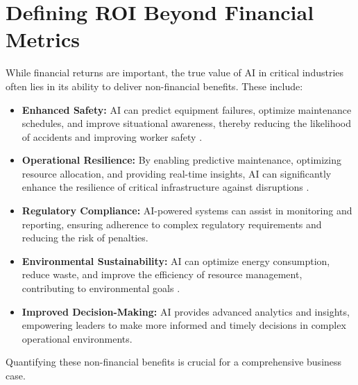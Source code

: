 \section{Defining ROI Beyond Financial Metrics}
While financial returns are important, the true value of AI in critical industries often lies in its ability to deliver non-financial benefits. These include:
\begin{itemize}
    \item \textbf{Enhanced Safety:} AI can predict equipment failures, optimize maintenance schedules, and improve situational awareness, thereby reducing the likelihood of accidents and improving worker safety \parencite{Chen2019}.
    \item \textbf{Operational Resilience:} By enabling predictive maintenance, optimizing resource allocation, and providing real-time insights, AI can significantly enhance the resilience of critical infrastructure against disruptions \parencite{Davis2020}.
    \item \textbf{Regulatory Compliance:} AI-powered systems can assist in monitoring and reporting, ensuring adherence to complex regulatory requirements and reducing the risk of penalties.
    \item \textbf{Environmental Sustainability:} AI can optimize energy consumption, reduce waste, and improve the efficiency of resource management, contributing to environmental goals \parencite{Wang2021}.
    \item \textbf{Improved Decision-Making:} AI provides advanced analytics and insights, empowering leaders to make more informed and timely decisions in complex operational environments.
\end{itemize}
Quantifying these non-financial benefits is crucial for a comprehensive business case.

